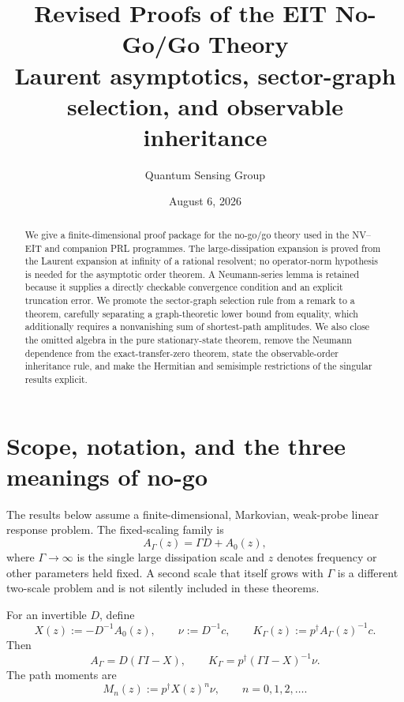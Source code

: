 \documentclass[11pt,a4paper]{article}
\title{\bfseries Revised Proofs of the EIT No-Go/Go Theory\\[4pt]
\large Laurent asymptotics, sector-graph selection, and observable inheritance}
\author{Quantum Sensing Group}
\date{August 6, 2026}
\theoremstyle{remark}
\begin{document}
\maketitle

\begin{abstract}
We give a finite-dimensional proof package for the no-go/go theory used in the
NV--EIT and companion PRL programmes.  The large-dissipation expansion is
proved from the Laurent expansion at infinity of a rational resolvent; no
operator-norm hypothesis is needed for the asymptotic order theorem.  A
Neumann-series lemma is retained because it supplies a directly checkable
convergence condition and an explicit truncation error.  We promote the
sector-graph selection rule from a remark to a theorem, carefully separating a
graph-theoretic lower bound from equality, which additionally requires a
nonvanishing sum of shortest-path amplitudes.  We also close the omitted
algebra in the pure stationary-state theorem, remove the Neumann dependence
from the exact-transfer-zero theorem, state the observable-order inheritance
rule, and make the Hermitian and semisimple restrictions of the singular
results explicit.
\end{abstract}

\tableofcontents

\section{Scope, notation, and the three meanings of no-go}

\begin{scopebox}
The results below assume a finite-dimensional, Markovian, weak-probe linear
response problem.  The fixed-scaling family is
\[
A_\Gamma(z)=\Gamma D+A_0(z),
\]
where $\Gamma\to\infty$ is the single large dissipation scale and $z$ denotes
frequency or other parameters held fixed.  A second scale that itself grows
with $\Gamma$ is a different two-scale problem and is not silently included in
these theorems.
\end{scopebox}

For an invertible $D$, define
\begin{equation}
X(z):=-D^{-1}A_0(z),\qquad \nu:=D^{-1}c,
\qquad K_\Gamma(z):=p^\dagger A_\Gamma(z)^{-1}c.
\label{eq:standing}
\end{equation}
Then
\begin{equation}
A_\Gamma=D(\Gamma I-X),
\qquad
K_\Gamma=p^\dagger(\Gamma I-X)^{-1}\nu.
\label{eq:factor}
\end{equation}
The path moments are
\begin{equation}
M_n(z):=p^\dagger X(z)^n\nu,
\qquad n=0,1,2,\ldots.
\label{eq:moments}
\end{equation}
\end{document}

